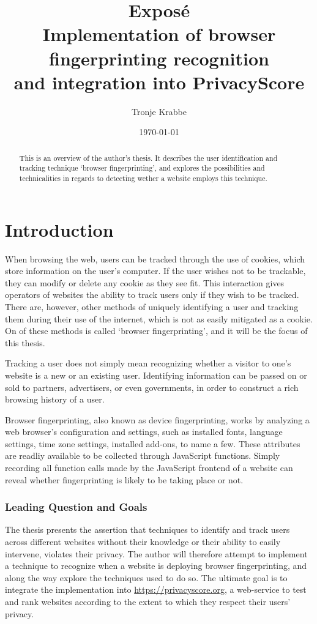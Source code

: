 \documentclass[a4paper, 12pt]{scrreprt}
\title{
    Exposé\\
    \medskip
    \large Implementation of browser fingerprinting recognition \\
    and integration into PrivacyScore
}
\author{Tronje Krabbe}
\date{\today}
\begin{document}
\hypersetup{hidelinks}

\maketitle

\begin{abstract}
    \doublespacing
    This is an overview of the author's thesis. It describes the user identification and tracking technique `browser fingerprinting',
    and explores the possibilities and technicalities in regards to detecting wether a website employs this technique.
\end{abstract}

\tableofcontents

\chapter{Introduction}
When browsing the web, users can be tracked through the use of cookies, which store information on the user's computer.
If the user wishes not to be trackable, they can modify or delete any cookie as they see fit. This interaction gives
operators of websites the ability to track users only if they wish to be tracked.
There are, however, other methods of uniquely identifying a user and tracking them during their use of the internet,
which is not as easily mitigated as a cookie.\cite{am_i_unique} On of these methods is called `browser fingerprinting', and it will be
the focus of this thesis.

Tracking a user does not simply mean recognizing whether a visitor to one's website is a new or an existing user.
Identifying information can be passed on or sold to partners, advertisers, or even governments, in order to
construct a rich browsing history of a user.

Browser fingerprinting, also known as device fingerprinting, works by analyzing a web browser's configuration and settings,
such as installed fonts, language settings, time zone settings, installed add-ons, to name a few.
These attributes are readliy available to be collected through JavaScript functions. Simply recording
all function calls made by the JavaScript frontend of a website can reveal whether fingerprinting is likely to
be taking place or not.\cite{faiz2014browser}\cite{panopticlick}

    \subsection{Leading Question and Goals}
    The thesis presents the assertion that techniques to identify and track users across different websites without
    their knowledge or their ability to easily intervene, violates their privacy.
    The author will therefore attempt to implement a technique to recognize when a website is deploying browser fingerprinting,
    and along the way explore the techniques used to do so.
    The ultimate goal is to integrate the implementation into \url{https://privacyscore.org}, a web-service to test and rank
    websites according to the extent to which they respect their users' privacy.
\end{document}
